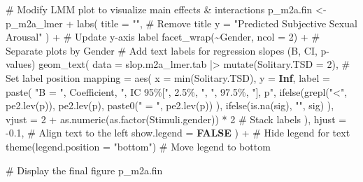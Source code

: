 \documentclass[
  bookmarksnumbered]{article}
\newenvironment{Shaded}{\begin{snugshade}}{\end{snugshade}}
\newcommand{\AttributeTok}[1]{\textcolor[rgb]{0.80,0.80,0.80}{#1}}
\newcommand{\CommentTok}[1]{\textcolor[rgb]{0.50,0.62,0.50}{#1}}
\newcommand{\ConstantTok}[1]{\textcolor[rgb]{0.86,0.64,0.64}{\textbf{#1}}}
\newcommand{\DecValTok}[1]{\textcolor[rgb]{0.86,0.86,0.80}{#1}}
\newcommand{\FloatTok}[1]{\textcolor[rgb]{0.75,0.75,0.82}{#1}}
\newcommand{\FunctionTok}[1]{\textcolor[rgb]{0.94,0.94,0.56}{#1}}
\newcommand{\NormalTok}[1]{\textcolor[rgb]{0.80,0.80,0.80}{#1}}
\newcommand{\OtherTok}[1]{\textcolor[rgb]{0.94,0.94,0.56}{#1}}
\newcommand{\SpecialCharTok}[1]{\textcolor[rgb]{0.86,0.64,0.64}{#1}}
\newcommand{\StringTok}[1]{\textcolor[rgb]{0.80,0.58,0.58}{#1}}
\begin{document}
\begin{Shaded}
\begin{Highlighting}[]
\CommentTok{\# Modify LMM plot to visualize main effects \& interactions}
\NormalTok{p\_m2a.fin }\OtherTok{\textless{}{-}}\NormalTok{ p\_m2a\_lmer }\SpecialCharTok{+}
  \FunctionTok{labs}\NormalTok{(}
    \AttributeTok{title =} \StringTok{""}\NormalTok{, }\CommentTok{\# Remove title}
    \AttributeTok{y =} \StringTok{"Predicted Subjective Sexual Arousal"}
\NormalTok{  ) }\SpecialCharTok{+} \CommentTok{\# Update y{-}axis label}
  \FunctionTok{facet\_wrap}\NormalTok{(}\SpecialCharTok{\textasciitilde{}}\NormalTok{Gender, }\AttributeTok{ncol =} \DecValTok{2}\NormalTok{) }\SpecialCharTok{+} \CommentTok{\# Separate plots by Gender}
  \CommentTok{\# Add text labels for regression slopes (B, CI, p{-}values)}
  \FunctionTok{geom\_text}\NormalTok{(}
    \AttributeTok{data =}\NormalTok{ slop.m2a\_lmer.tab }\SpecialCharTok{|\textgreater{}}
      \FunctionTok{mutate}\NormalTok{(}\AttributeTok{Solitary.TSD =} \DecValTok{2}\NormalTok{), }\CommentTok{\# Set label position}
    \AttributeTok{mapping =} \FunctionTok{aes}\NormalTok{(}
      \AttributeTok{x =} \FunctionTok{min}\NormalTok{(Solitary.TSD), }\AttributeTok{y =} \ConstantTok{Inf}\NormalTok{,}
      \AttributeTok{label =} \FunctionTok{paste}\NormalTok{(}
        \StringTok{"B = "}\NormalTok{, Coefficient,}
        \StringTok{", IC 95\%["}\NormalTok{, }\StringTok{\textasciigrave{}}\AttributeTok{2.5\%}\StringTok{\textasciigrave{}}\NormalTok{, }\StringTok{", "}\NormalTok{, }\StringTok{\textasciigrave{}}\AttributeTok{97.5\%}\StringTok{\textasciigrave{}}\NormalTok{, }\StringTok{"], p"}\NormalTok{,}
        \FunctionTok{ifelse}\NormalTok{(}\FunctionTok{grepl}\NormalTok{(}\StringTok{"\textless{}"}\NormalTok{, }\FunctionTok{pe2.lev}\NormalTok{(p)), }\FunctionTok{pe2.lev}\NormalTok{(p),}
          \FunctionTok{paste0}\NormalTok{(}\StringTok{" = "}\NormalTok{, }\FunctionTok{pe2.lev}\NormalTok{(p))}
\NormalTok{        ),}
        \FunctionTok{ifelse}\NormalTok{(}\FunctionTok{is.na}\NormalTok{(sig), }\StringTok{""}\NormalTok{, sig)}
\NormalTok{      ),}
      \AttributeTok{vjust =} \DecValTok{2} \SpecialCharTok{+} \FunctionTok{as.numeric}\NormalTok{(}\FunctionTok{as.factor}\NormalTok{(Stimuli.gender)) }\SpecialCharTok{*} \DecValTok{2} \CommentTok{\# Stack labels}
\NormalTok{    ),}
    \AttributeTok{hjust =} \SpecialCharTok{{-}}\FloatTok{0.1}\NormalTok{, }\CommentTok{\# Align text to the left}
    \AttributeTok{show.legend =} \ConstantTok{FALSE}
\NormalTok{  ) }\SpecialCharTok{+} \CommentTok{\# Hide legend for text}
  \FunctionTok{theme}\NormalTok{(}\AttributeTok{legend.position =} \StringTok{"bottom"}\NormalTok{) }\CommentTok{\# Move legend to bottom}

\CommentTok{\# Display the final figure}
\NormalTok{p\_m2a.fin}
\end{Highlighting}
\end{Shaded}
\end{document}
